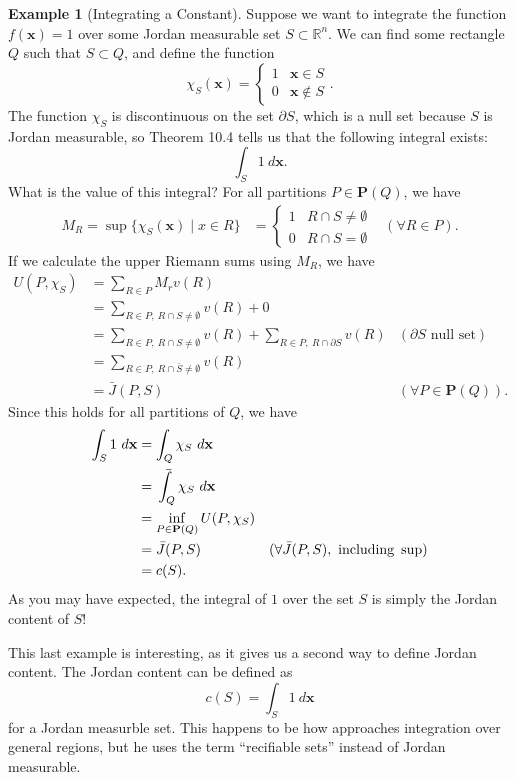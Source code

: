 \documentclass{article}
\def\upint{\mathchoice%
	{\mkern13mu\overline{\vphantom{\intop}\mkern7mu}\mkern-20mu}%
	{\mkern7mu\overline{\vphantom{\intop}\mkern7mu}\mkern-14mu}%
	{\mkern7mu\overline{\vphantom{\intop}\mkern7mu}\mkern-14mu}%
	{\mkern7mu\overline{\vphantom{\intop}\mkern7mu}\mkern-14mu}%
	\int}
\newcommand{\R}{\mathbb{R}}
\newcommand{\x}{\mathbf{x}}
\theoremstyle{definition}
\newtheorem{example}{Example}[section]
\begin{document}
\begin{example}[Integrating a Constant]
	Suppose we want to integrate the function $f(\x) = 1$ over some Jordan measurable set $S\subset \R^n$. We can find some rectangle $Q$ such that $S\subset Q$, and define the function 
	$$ \chi_S(\x) =  \begin{cases}
		1 & \x\in S\\
		0 &\x\notin S
	\end{cases}.$$
The function $\chi_S$ is discontinuous on the set $\partial S$, which is a null set because $S$ is Jordan measurable, so Theorem 10.4 tells us that the following integral exists:
$$ \int_S 1\ d\x .$$ What is the value of this integral? For all partitions $P \in \mathbf P(Q)$, we have 
\begin{align*}
M_R = \sup\{\chi_S(\x)\mid x\in R\} &= \begin{cases}
	1& R\cap S \neq \emptyset\\ 0 & R\cap S=\emptyset
\end{cases} & (\forall R \in P).
\end{align*}
If we calculate the upper Riemann sums using $M_R$, we have 
\begin{align*}
U(P,\chi_S)& = \sum_{R\in P} M_r v(R)\\ & = \sum_{R\in P, \ R\cap S \neq \emptyset} v(R) + 0\\ & = \sum_{R\in P, \ R\cap S \neq \emptyset} v(R) + \sum_{R\in P, \ R\cap \partial S} v(R) & (\partial S\text{ null set})\\
& =  \sum_{R\in P, \ R\cap \bar S \neq \emptyset} v(R) \\
& = \bar J(P,S) &(\forall P \in \mathbf P(Q)).
\end{align*}
Since this holds for all partitions of $Q$, we have 
\begin{align*}
	\int_S 1\ d\x & = \int_Q \chi_S\ d\x \\
	& = \upint_Q\chi_S\ d\x\\
	& = \inf_{P\in \textbf{P}(Q)} U(P,\chi_S) \\
	& =  \bar J(P,S) &(\forall \bar J(P,S),\text{ including }\sup)\\
	& = c(S) .
\end{align*}
As you may have expected, the integral of $1$ over the set $S$ is simply the Jordan content of $S$!
\end{example}

This last example is interesting, as it gives us a second way to define Jordan content. The Jordan content can be defined as 
$$ c(S) = \int_S 1 \ d\x$$ for a Jordan measurble set. This happens to be how \cite{munk1} approaches integration over general regions, but he uses the term ``recifiable sets'' instead of Jordan measurable.
\end{document}
